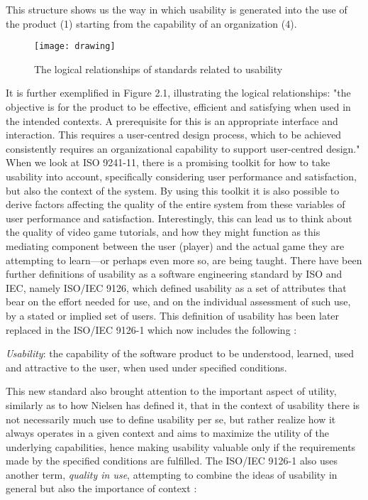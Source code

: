 This structure shows us the way in which usability is generated into the use of the product (1) starting from the capability of an organization (4). 

\begin{figure}[h]
	\centering
	\texttt{[image: drawing]}
	\caption{The logical relationships of standards related to usability \cite{Bevan2006}}
\end{figure}

It is further exemplified in Figure 2.1, illustrating the logical relationships: "the objective is for the product to be effective, efficient and satisfying when used in the intended contexts. A prerequisite for this is an appropriate interface and interaction. This requires a user-centred design process, which to be achieved consistently requires an organizational capability to support user-centred design." \cite{Bevan2006} When we look at ISO 9241-11, there is a promising toolkit for how to take usability into account, specifically considering user performance and satisfaction, but also the context of the system. By using this toolkit it is also possible to derive factors affecting the quality of the entire system from these variables of user performance and satisfaction. \cite{Bevan2006} Interestingly, this can lead us to think about the quality of video game tutorials, and how they might function as this mediating component between the user (player) and the actual game they are attempting to learn---or perhaps even more so, are being taught. There have been further definitions of usability as a software engineering standard by ISO and IEC, namely ISO/IEC 9126, which defined usability as a set of attributes that bear on the effort needed for use, and on the individual assessment of such use, by a stated or implied set of users. \cite{Bevan2006} This definition of usability has been later replaced in the ISO/IEC 9126-1 which now includes the following \cite{Bevan2006}:

\begin{displayquote}
	
	\textit{Usability}: the capability of the software product to be understood, learned, used and attractive to the user, when used under specified conditions.
	
\end{displayquote}

This new standard also brought attention to the important aspect of utility, similarly as to how Nielsen has defined it, that in the context of usability there is not necessarily much use to define usability per se, but rather realize how it always operates in a given context and aims to maximize the utility of the underlying capabilities, hence making usability valuable only if the requirements made by the specified conditions are fulfilled. The ISO/IEC 9126-1 also uses another term, \textit{quality in use}, attempting to combine the ideas of usability in general but also the importance of context \cite{Bevan2006}:

